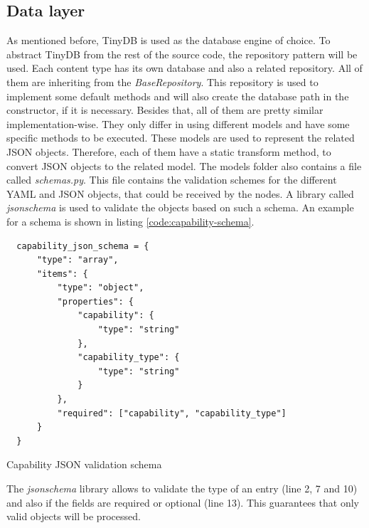 \subsection{Data layer}
\label{subsection:impl-data-layer}
As mentioned before, TinyDB is used as the database engine of choice.
To abstract TinyDB from the rest of the source code, the repository pattern will be used.
Each content type has its own database and also a related repository.
All of them are inheriting from the \textit{BaseRepository}.
This repository is used to implement some default methods and will also create the database path in the constructor, if it is necessary.
Besides that, all of them are pretty similar implementation-wise.
They only differ in using different models and have some specific methods to be executed.
These models are used to represent the related \ac{JSON} objects.
Therefore, each of them have a static transform method, to convert \ac{JSON} objects to the related model.
The models folder also contains a file called \textit{schemas.py}.
This file contains the validation schemes for the different \ac{YAML} and \ac{JSON} objects, that could be received by the nodes.
A library called \textit{jsonschema} is used to validate the objects based on such a schema.
An example for a schema is shown in listing \ref{code:capability-schema}.
\begin{listing}[H]
  \begin{verbatim}
  capability_json_schema = {
      "type": "array",
      "items": {
          "type": "object",
          "properties": {
              "capability": {
                  "type": "string"
              },
              "capability_type": {
                  "type": "string"
              }
          },
          "required": ["capability", "capability_type"]
      }
  }
  \end{verbatim}
  \caption[Capability JSON validation schema]{Capability \ac{JSON} validation schema}
  \label{code:capability-schema}
\end{listing}
The \textit{jsonschema} library allows to validate the type of an entry (line 2, 7 and 10) and also if the fields are required or optional (line 13).
This guarantees that only valid objects will be processed.


